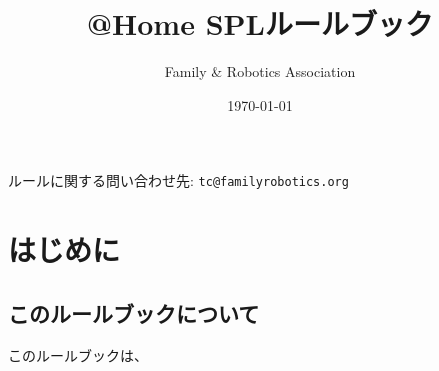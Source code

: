 \documentclass[a4j,12pt]{jarticle}
\title{@Home SPLルールブック}
\author{Family \& Robotics Association}
\date{\today}
\begin{document}
%
%
\maketitle

ルールに関する問い合わせ先: {\tt tc@familyrobotics.org}
\vspace{3em}
%
%
\tableofcontents
\newpage

\section{はじめに}

\subsection{このルールブックについて}

このルールブックは、

%
\end{document}
